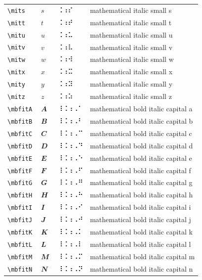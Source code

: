 \documentclass[oneside]{article}
\begin{document}
\begin{longtable}{llll}
\verb|\mits| & $\mits$ &  ⠨⠰⠎  & {mathematical italic small s} \\[2ex]
\verb|\mitt| & $\mitt$ &  ⠨⠰⠞  & {mathematical italic small t} \\[2ex]
\verb|\mitu| & $\mitu$ &  ⠨⠰⠥  & {mathematical italic small u} \\[2ex]
\verb|\mitv| & $\mitv$ &  ⠨⠰⠧  & {mathematical italic small v} \\[2ex]
\verb|\mitw| & $\mitw$ &  ⠨⠰⠺  & {mathematical italic small w} \\[2ex]
\verb|\mitx| & $\mitx$ &  ⠨⠰⠭  & {mathematical italic small x} \\[2ex]
\verb|\mity| & $\mity$ &  ⠨⠰⠽  & {mathematical italic small y} \\[2ex]
\verb|\mitz| & $\mitz$ &  ⠨⠰⠵  & {mathematical italic small z} \\[2ex]
\verb|\mbfitA| & $\mbfitA$ &  ⠸⠨⠰⠠⠁  & {mathematical bold italic capital a} \\[2ex]
\verb|\mbfitB| & $\mbfitB$ &  ⠸⠨⠰⠠⠃  & {mathematical bold italic capital b} \\[2ex]
\verb|\mbfitC| & $\mbfitC$ &  ⠸⠨⠰⠠⠉  & {mathematical bold italic capital c} \\[2ex]
\verb|\mbfitD| & $\mbfitD$ &  ⠸⠨⠰⠠⠙  & {mathematical bold italic capital d} \\[2ex]
\verb|\mbfitE| & $\mbfitE$ &  ⠸⠨⠰⠠⠑  & {mathematical bold italic capital e} \\[2ex]
\verb|\mbfitF| & $\mbfitF$ &  ⠸⠨⠰⠠⠋  & {mathematical bold italic capital f} \\[2ex]
\verb|\mbfitG| & $\mbfitG$ &  ⠸⠨⠰⠠⠛  & {mathematical bold italic capital g} \\[2ex]
\verb|\mbfitH| & $\mbfitH$ &  ⠸⠨⠰⠠⠓  & {mathematical bold italic capital h} \\[2ex]
\verb|\mbfitI| & $\mbfitI$ &  ⠸⠨⠰⠠⠊  & {mathematical bold italic capital i} \\[2ex]
\verb|\mbfitJ| & $\mbfitJ$ &  ⠸⠨⠰⠠⠚  & {mathematical bold italic capital j} \\[2ex]
\verb|\mbfitK| & $\mbfitK$ &  ⠸⠨⠰⠠⠅  & {mathematical bold italic capital k} \\[2ex]
\verb|\mbfitL| & $\mbfitL$ &  ⠸⠨⠰⠠⠇  & {mathematical bold italic capital l} \\[2ex]
\verb|\mbfitM| & $\mbfitM$ &  ⠸⠨⠰⠠⠍  & {mathematical bold italic capital m} \\[2ex]
\verb|\mbfitN| & $\mbfitN$ &  ⠸⠨⠰⠠⠝  & {mathematical bold italic capital n} \\[2ex]

\end{longtable}
\end{document}
